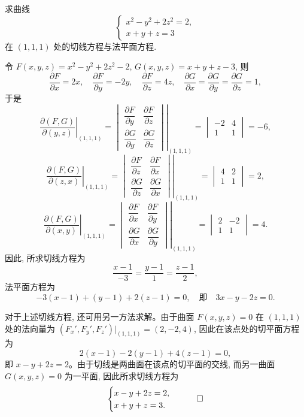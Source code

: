 \begin{example}\label{example:ma-14-6-1}
求曲线
\[
  \begin{cases}
    x^2-y^2+2z^2=2,\\
    x+y+z=3
  \end{cases}
\]
在 $(1,1,1)$ 处的切线方程与法平面方程.
\end{example}


\begin{solve}
令 $F(x,y,z)=x^2-y^2+2z^2-2$, $G(x,y,z)=x+y+z-3$, 则
\[
  \frac{\partial F}{\partial x}=2x,\quad
  \frac{\partial F}{\partial y}=-2y,\quad
  \frac{\partial F}{\partial z}=4z,\quad
  \frac{\partial G}{\partial x}
  =
  \frac{\partial G}{\partial y}
  =
  \frac{\partial G}{\partial z}
  =1,
\]
于是
\[
  \left.\frac{\partial(F,G)}{\partial(y,z)}\right|_{(1,1,1)}
  =
  \left.
  \begin{vmatrix}
    \dfrac{\partial F}{\partial y} & \dfrac{\partial F}{\partial z}\\
    \dfrac{\partial G}{\partial y} & \dfrac{\partial G}{\partial z}
  \end{vmatrix}
  \right|_{(1,1,1)}
  =
  \begin{vmatrix}
    -2 & 4\\
    1 & 1
  \end{vmatrix}
  =-6,
\]
\[
  \left.\frac{\partial(F,G)}{\partial(z,x)}\right|_{(1,1,1)}
  =
  \left.
  \begin{vmatrix}
    \dfrac{\partial F}{\partial z} & \dfrac{\partial F}{\partial x}\\
    \dfrac{\partial G}{\partial z} & \dfrac{\partial G}{\partial x}
  \end{vmatrix}
  \right|_{(1,1,1)}
  =
  \begin{vmatrix}
    4 & 2\\
    1 & 1
  \end{vmatrix}
  =2,
\]
\[
  \left.\frac{\partial(F,G)}{\partial(x,y)}\right|_{(1,1,1)}
  =
  \left.
  \begin{vmatrix}
    \dfrac{\partial F}{\partial x} & \dfrac{\partial F}{\partial y}\\
    \dfrac{\partial G}{\partial x} & \dfrac{\partial G}{\partial y}
  \end{vmatrix}
  \right|_{(1,1,1)}
  =
  \begin{vmatrix}
    2 & -2\\
    1 & 1
  \end{vmatrix}
  =4.
\]
因此, 所求切线方程为
\[
  \frac{x-1}{-3}=\frac{y-1}{1}=\frac{z-1}{2},
\]
法平面方程为
\[
  -3(x-1)+(y-1)+2(z-1)=0,\quad \text{即}\quad 3x-y-2z=0.
\]

对于上述切线方程, 还可用另一方法求解。由于曲面 $F(x,y,z)=0$ 在 $(1,1,1)$ 处的法向量为 $(F_x',F_y',F_z')|_{(1,1,1)}=(2,-2,4)$, 因此在该点处的切平面方程为
\[
  2(x-1)-2(y-1)+4(z-1)=0,
\]
即 $x-y+2z=2$。由于切线是两曲面在该点的切平面的交线, 而另一曲面 $G(x,y,z)=0$ 为一平面, 因此所求切线方程为
\[
  \begin{cases}
    x-y+2z=2,\\
    x+y+z=3.
  \end{cases}
\qedhere
\]
\end{solve}


